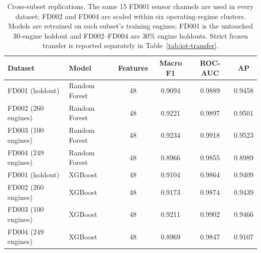 \begin{table}[H]
\centering
\caption{Cross-subset replications. The same 15 FD001 sensor channels are used in every
dataset; FD002 and FD004 are scaled within six operating-regime clusters. Models are
retrained on each subset's training engines; FD001 is the untouched 30-engine holdout
and FD002--FD004 are 30\% engine holdouts. Strict frozen transfer is reported separately
in Table~\ref{tab:iot-transfer}.}
\label{tab:iot-external}
\small
\begin{tabular}{llcccc}
\toprule
Dataset & Model & Features & Macro F1 & ROC-AUC & AP \\
\midrule
FD001 (holdout) & Random Forest & 48 & 0.9094 & 0.9889 & 0.9458 \\
FD002 (260 engines) & Random Forest & 48 & 0.9221 & 0.9897 & 0.9501 \\
FD003 (100 engines) & Random Forest & 48 & 0.9234 & 0.9918 & 0.9523 \\
FD004 (249 engines) & Random Forest & 48 & 0.8966 & 0.9855 & 0.8989 \\
FD001 (holdout) & XGBoost & 48 & 0.9104 & 0.9864 & 0.9409 \\
FD002 (260 engines) & XGBoost & 48 & 0.9173 & 0.9874 & 0.9439 \\
FD003 (100 engines) & XGBoost & 48 & 0.9211 & 0.9902 & 0.9466 \\
FD004 (249 engines) & XGBoost & 48 & 0.8969 & 0.9847 & 0.9107 \\
\bottomrule
\end{tabular}
\end{table}
